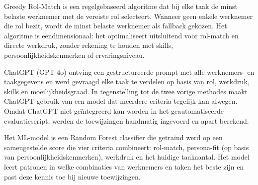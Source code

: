 Greedy Rol-Match is een regelgebaseerd algoritme dat bij elke taak de minst belaste werknemer met de vereiste rol selecteert. Wanneer geen enkele werknemer die rol bezit, wordt de minst belaste werknemer als fallback gekozen. Het algoritme is eendimensionaal: het optimaliseert uitsluitend voor rol-match en directe werkdruk, zonder rekening te houden met skills, persoonlijkheidskenmerken of ervaringsniveau.

ChatGPT (GPT-4o) ontving een gestructureerde prompt met alle werknemers- en taakgegevens en werd gevraagd elke taak te verdelen op basis van rol, werkdruk, skills en moeilijkheidsgraad. In tegenstelling tot de twee vorige methodes maakt ChatGPT gebruik van een model dat meerdere criteria tegelijk kan afwegen. Omdat ChatGPT niet geïntegreerd kan worden in het geautomatiseerde evaluatiescript, werden de toewijzingen handmatig ingevoerd en apart berekend.

Het ML-model is een Random Forest classifier die getraind werd op een samengestelde score die vier criteria combineert: rol-match, persona-fit (op basis van persoonlijkheidskenmerken), werkdruk en het huidige taakaantal. Het model leert patronen in welke combinaties van werknemers en taken het beste zijn en past deze kennis toe bij nieuwe toewijzingen.

